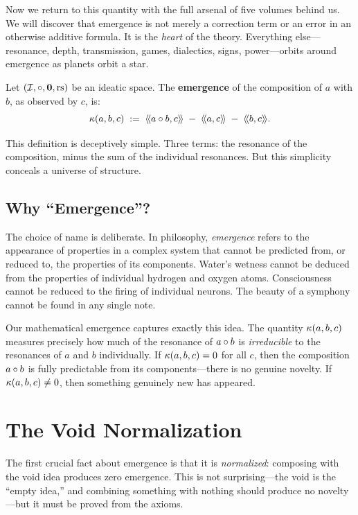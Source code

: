Now we return to this quantity with the full arsenal of five volumes behind us.
We will discover that emergence is not merely a correction term or an error in
an otherwise additive formula. It is the \emph{heart} of the theory. Everything
else---resonance, depth, transmission, games, dialectics, signs, power---orbits
around emergence as planets orbit a star.

\begin{definition}[Emergence]
\label{def:emergence}
Let $(\mathcal{I}, \circ, \mathbf{0}, \mathrm{rs})$ be an ideatic space. The
\textbf{emergence} of the composition of $a$ with $b$, as observed by $c$, is:
\[
  \kappa(a, b, c) \;:=\; \langle\!\langle a \circ b, c \rangle\!\rangle \;-\; \langle\!\langle a, c \rangle\!\rangle \;-\; \langle\!\langle b, c \rangle\!\rangle.
\]
\end{definition}

This definition is deceptively simple. Three terms: the resonance of the
composition, minus the sum of the individual resonances. But this simplicity
conceals a universe of structure.

\subsection{Why ``Emergence''?}

The choice of name is deliberate. In philosophy, \emph{emergence} refers to the
appearance of properties in a complex system that cannot be predicted from, or
reduced to, the properties of its components. Water's wetness cannot be deduced
from the properties of individual hydrogen and oxygen atoms. Consciousness
cannot be reduced to the firing of individual neurons. The beauty of a symphony
cannot be found in any single note.

Our mathematical emergence captures exactly this idea. The quantity
$\kappa(a,b,c)$ measures precisely how much of the resonance of $a \circ b$
is \emph{irreducible} to the resonances of $a$ and $b$ individually. If
$\kappa(a,b,c) = 0$ for all $c$, then the composition $a \circ b$ is fully
predictable from its components---there is no genuine novelty. If
$\kappa(a,b,c) \neq 0$, then something genuinely new has appeared.


\section{The Void Normalization}

The first crucial fact about emergence is that it is \emph{normalized}: composing
with the void idea produces zero emergence. This is not surprising---the void is
the ``empty idea,'' and combining something with nothing should produce no
novelty---but it must be proved from the axioms.

